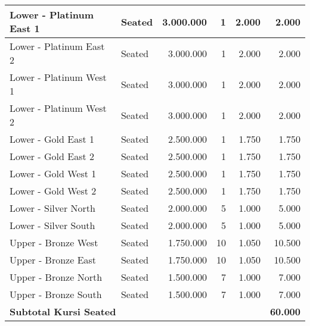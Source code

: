 \begin{longtable}{|l|l|r|r|r|r|}
    Lower - Platinum East 1                                         & Seated          & 3.000.000           & 1             & 2.000               & 2.000          \\
    \hline
    Lower - Platinum East 2                                         & Seated          & 3.000.000           & 1             & 2.000               & 2.000          \\
    \hline
    Lower - Platinum West 1                                         & Seated          & 3.000.000           & 1             & 2.000               & 2.000          \\
    \hline
    Lower - Platinum West 2                                         & Seated          & 3.000.000           & 1             & 2.000               & 2.000          \\
    \hline
    Lower - Gold East 1                                             & Seated          & 2.500.000           & 1             & 1.750               & 1.750          \\
    \hline
    Lower - Gold East 2                                             & Seated          & 2.500.000           & 1             & 1.750               & 1.750          \\
    \hline
    Lower - Gold West 1                                             & Seated          & 2.500.000           & 1             & 1.750               & 1.750          \\
    \hline
    Lower - Gold West 2                                             & Seated          & 2.500.000           & 1             & 1.750               & 1.750          \\
    \hline
    Lower - Silver North                                            & Seated          & 2.000.000           & 5             & 1.000               & 5.000          \\
    \hline
    Lower - Silver South                                            & Seated          & 2.000.000           & 5             & 1.000               & 5.000          \\
    \hline
    Upper - Bronze West                                             & Seated          & 1.750.000           & 10            & 1.050               & 10.500         \\
    \hline
    Upper - Bronze East                                             & Seated          & 1.750.000           & 10            & 1.050               & 10.500         \\
    \hline
    Upper - Bronze North                                            & Seated          & 1.500.000           & 7             & 1.000               & 7.000          \\
    \hline
    Upper - Bronze South                                            & Seated          & 1.500.000           & 7             & 1.000               & 7.000          \\
    \hline
    \multicolumn{5}{|l|}{\textbf{Subtotal Kursi Seated}}            & \textbf{60.000}                                                                              \\
    \hline \hline


\end{longtable}
